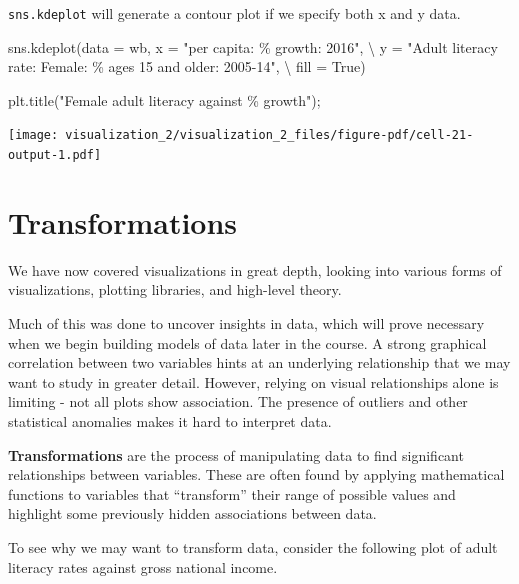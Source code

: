\documentclass[
  letterpaper,
  DIV=11,
  numbers=noendperiod]{scrreprt}
\newenvironment{Shaded}{\begin{snugshade}}{\end{snugshade}}
\newcommand{\NormalTok}[1]{\textcolor[rgb]{0.00,0.23,0.31}{#1}}
\newcommand{\OperatorTok}[1]{\textcolor[rgb]{0.37,0.37,0.37}{#1}}
\newcommand{\SpecialCharTok}[1]{\textcolor[rgb]{0.37,0.37,0.37}{#1}}
\newcommand{\StringTok}[1]{\textcolor[rgb]{0.13,0.47,0.30}{#1}}
\newcommand{\VariableTok}[1]{\textcolor[rgb]{0.07,0.07,0.07}{#1}}
\begin{document}
\texttt{sns.kdeplot} will generate a contour plot if we specify both x
and y data.

\begin{Shaded}
\begin{Highlighting}[]
\NormalTok{sns.kdeplot(data }\OperatorTok{=}\NormalTok{ wb, x }\OperatorTok{=} \StringTok{"per capita: }\SpecialCharTok{\% g}\StringTok{rowth: 2016"}\NormalTok{, }\OperatorTok{\textbackslash{}}
\NormalTok{            y }\OperatorTok{=} \StringTok{"Adult literacy rate: Female: \% ages 15 and older: 2005{-}14"}\NormalTok{, }\OperatorTok{\textbackslash{}}
\NormalTok{            fill }\OperatorTok{=} \VariableTok{True}\NormalTok{)}

\NormalTok{plt.title(}\StringTok{"Female adult literacy against }\SpecialCharTok{\% g}\StringTok{rowth"}\NormalTok{)}\OperatorTok{;}
\end{Highlighting}
\end{Shaded}

\texttt{[image: visualization\_2/visualization\_2\_files/figure-pdf/cell-21-output-1.pdf]}

\section{Transformations}\label{transformations}

We have now covered visualizations in great depth, looking into various
forms of visualizations, plotting libraries, and high-level theory.

Much of this was done to uncover insights in data, which will prove
necessary when we begin building models of data later in the course. A
strong graphical correlation between two variables hints at an
underlying relationship that we may want to study in greater detail.
However, relying on visual relationships alone is limiting - not all
plots show association. The presence of outliers and other statistical
anomalies makes it hard to interpret data.

\textbf{Transformations} are the process of manipulating data to find
significant relationships between variables. These are often found by
applying mathematical functions to variables that ``transform'' their
range of possible values and highlight some previously hidden
associations between data.

To see why we may want to transform data, consider the following plot of
adult literacy rates against gross national income.
\end{document}
